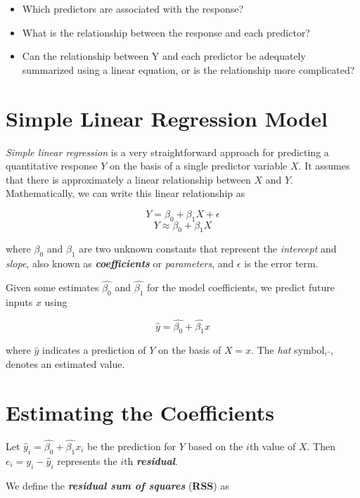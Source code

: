 \documentclass[]{book}
\providecommand{\tightlist}{%
  \setlength{\itemsep}{0pt}\setlength{\parskip}{0pt}}
\begin{document}
\begin{itemize}
\tightlist
\item
  Which predictors are associated with the response?
\item
  What is the relationship between the response and each predictor?
\item
  Can the relationship between Y and each predictor be adequately
  summarized using a linear equation, or is the relationship more
  complicated?
\end{itemize}

\section{Simple Linear Regression
Model}\label{simple-linear-regression-model}

\emph{Simple linear regression} is a very straightforward approach for
predicting a quantitative response \(Y\) on the basis of a single
predictor variable \(X\). It assumes that there is approximately a
linear relationship between \(X\) and \(Y\). Mathematically, we can
write this linear relationship as

\[ Y = \beta_0 + \beta_1 X + \epsilon \]
\[Y \approx \beta_0 + \beta_1 X\]

where \(\beta_0\) and \(\beta_1\) are two unknown constants that
represent the \emph{intercept} and \emph{slope}, also known as
\textbf{\emph{coefficients}} or \emph{parameters}, and \(\epsilon\) is
the error term.

Given some estimates \(\hat{\beta_0}\) and \(\hat{\beta_1}\) for the
model coefficients, we predict future inputs \(x\) using

\[\hat{y} = \hat{\beta_0} + \hat{\beta_1} x\]

where \(\hat{y}\) indicates a prediction of \(Y\) on the basis of
\(X = x\). The \emph{hat} symbol, \(\hat{}\), denotes an estimated
value.

\section{Estimating the Coefficients}\label{estimating-the-coefficients}

Let \(\hat{y}_i = \hat{\beta_0} + \hat{\beta_1} x_i\) be the prediction
for \(Y\) based on the \(i\)th value of \(X\). Then
\(e_i = y_i - \hat{y}_i\) represents the \(i\)th
\textbf{\emph{residual}}.

We define the \textbf{\emph{residual sum of squares}} (\textbf{RSS}) as
\end{document}
